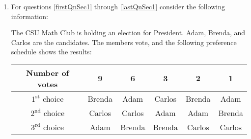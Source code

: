 \documentclass[12pt]{exam}
\begin{document}
\begin{enumerate} 

\item For questions \ref{firstQnSec1} through \ref{lastQnSec1} consider the following information:\par

The CSU Math Club is holding an election for President. Adam, Brenda, and Carlos are the candidates. The members vote, and the following preference schedule shows the results:

\setlength{\tabcolsep}{6pt} %
\renewcommand{\arraystretch}{1}
\setlength\extrarowheight{0pt}
\begin{table}[h]
    \centering
    \begin{tabular}{cccccc}
        \toprule
    Number of votes & 9      & 6      & 3      & 2     & 1      \\
    \midrule
    $1^{\text{st}}$ choice             & Brenda & Adam   & Carlos & Brenda & Adam   \\
    $2^{\text{nd}}$ choice & Carlos & Carlos & Adam   & Adam   & Brenda \\
    $3^{\text{rd}}$ choice & Adam   & Brenda & Brenda & Carlos & Carlos\\
    \bottomrule
    \end{tabular}
    \end{table}
    


\end{enumerate}
\end{document}
